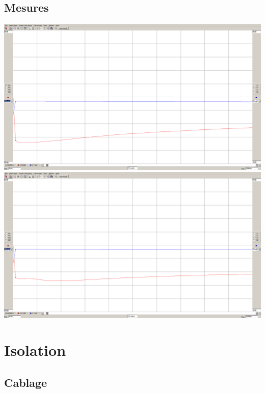 \documentclass[a4paper,12pt]{report}            %
\begin{document}
\subsection{Mesures}
\begin{center}
	\includegraphics[scale = 0.25]{pic/S11_S21_DPS1.png} \\
	\includegraphics[scale = 0.25]{pic/S22_S12_DPS1.png}
\end{center}

\section{Isolation}
\subsection{Cablage}
\end{document}
